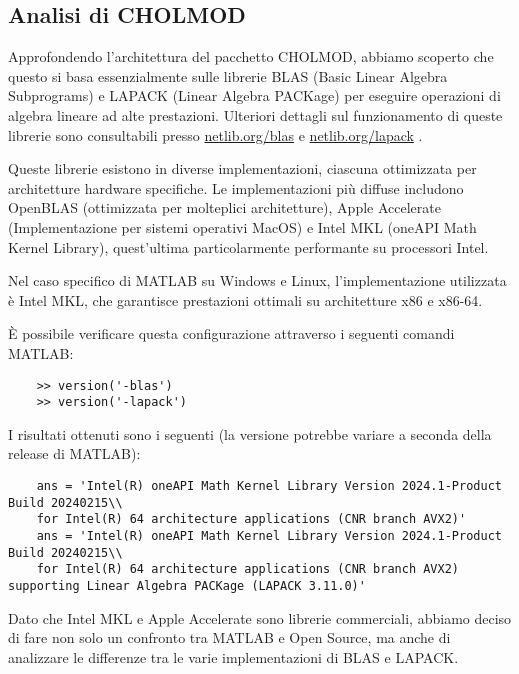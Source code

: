 \subsection{Analisi di CHOLMOD}

Approfondendo l'architettura del pacchetto CHOLMOD, abbiamo scoperto che questo si basa essenzialmente sulle librerie 
BLAS (Basic Linear Algebra Subprograms) e LAPACK (Linear Algebra PACKage) per eseguire operazioni di algebra lineare 
ad alte prestazioni. Ulteriori dettagli sul funzionamento di queste librerie sono consultabili presso 
\href{https://netlib.org/blas/}{netlib.org/blas} \cite{netlib_blas} e \href{https://netlib.org/lapack/}{netlib.org/lapack} \cite{netlib_lapack}.

Queste librerie esistono in diverse implementazioni, ciascuna ottimizzata per architetture hardware specifiche.
Le implementazioni più diffuse includono OpenBLAS (ottimizzata per molteplici architetture), Apple Accelerate 
(Implementazione per sistemi operativi MacOS) e Intel MKL (oneAPI Math Kernel Library), 
quest'ultima particolarmente performante su processori Intel.

Nel caso specifico di MATLAB su Windows e Linux, l'implementazione utilizzata è Intel MKL, 
che garantisce prestazioni ottimali su architetture x86 e x86-64.

È possibile verificare questa configurazione attraverso i seguenti comandi MATLAB:
\begin{verbatim}
    >> version('-blas')
    >> version('-lapack')
\end{verbatim}

I risultati ottenuti sono i seguenti (la versione potrebbe variare a seconda della release di MATLAB):
\begin{verbatim}
    ans = 'Intel(R) oneAPI Math Kernel Library Version 2024.1-Product Build 20240215\\
    for Intel(R) 64 architecture applications (CNR branch AVX2)'
    ans = 'Intel(R) oneAPI Math Kernel Library Version 2024.1-Product Build 20240215\\
    for Intel(R) 64 architecture applications (CNR branch AVX2) supporting Linear Algebra PACKage (LAPACK 3.11.0)'
\end{verbatim}

Dato che Intel MKL e Apple Accelerate sono librerie commerciali, abbiamo deciso di fare non solo un confronto tra MATLAB e Open Source,
ma anche di analizzare le differenze tra le varie implementazioni di BLAS e LAPACK.

